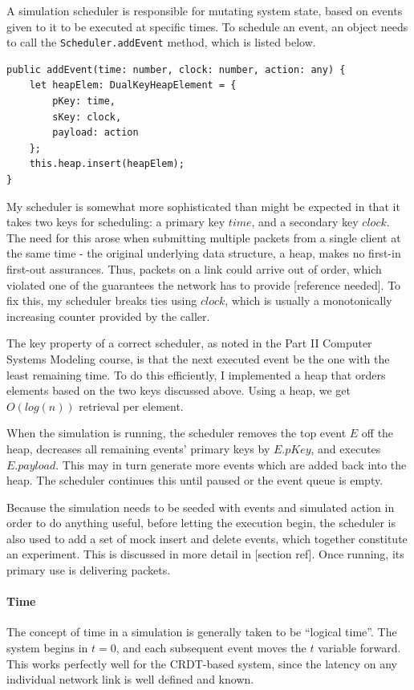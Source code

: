 \documentclass[12pt,a4paper,twoside,openright]{report}
\begin{document}
		A simulation scheduler is responsible for mutating system state, based on events given to it to be executed at specific times. To schedule an event, an object needs to call the \lstinline|Scheduler.addEvent| method, which is listed below.
\begin{lstlisting}[caption=The Scheduler.addEvent method]
public addEvent(time: number, clock: number, action: any) {
    let heapElem: DualKeyHeapElement = {
        pKey: time,
        sKey: clock,
        payload: action
    };
    this.heap.insert(heapElem);
}
\end{lstlisting}

		My scheduler is somewhat more sophisticated than might be expected in that it takes two keys for scheduling: a primary key $time$, and a secondary key $clock$. The need for this arose when submitting multiple packets from a single client at the same time - the original underlying data structure, a heap, makes no first-in first-out assurances. Thus, packets on a link could arrive out of order, which violated one of the guarantees the network has to provide [reference needed]. To fix this, my scheduler breaks ties using $clock$, which is usually a monotonically increasing counter provided by the caller.
		
		The key property of a correct scheduler, as noted in the Part II Computer Systems Modeling \cite[slide 120]{compsysmodeling} course, is that the next executed event be the one with the least remaining time. To do this efficiently, I implemented a heap that orders elements based on the two keys discussed above. Using a heap, we get $O(log(n))$ retrieval per element.
		
		When the simulation is running, the scheduler removes the top event $E$ off the heap, decreases all remaining events' primary keys by $E.pKey$, and executes $E.payload$. This may in turn generate more events which are added back into the heap. The scheduler continues this until paused or the event queue is empty.
		
		Because the simulation needs to be seeded with events and simulated action in order to do anything useful, before letting the execution begin, the scheduler is also used to add a set of mock insert and delete events, which together constitute an experiment. This is discussed in more detail in [section ref]. Once running, its primary use is delivering packets.
		
		\paragraph{Time}
		The concept of time in a simulation is generally taken to be ``logical time''. The system begins in $t = 0$, and each subsequent event moves the $t$ variable forward. This works perfectly well for the CRDT-based system, since the latency on any individual network link is well defined and known.
		
\end{document}
